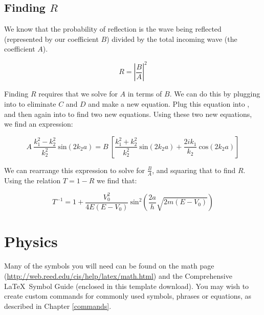 \subsection{Finding $R$}

We know that the probability of reflection is the wave being reflected (represented by our coefficient $B$) divided by the total incoming wave (the coefficient $A$).

$$R = \left|\frac{B}{A}\right|^2$$

Finding $R$ requires that we solve for $A$ in terms of $B$. We can do this by plugging  into  to eliminate $C$ and $D$ and make a new equation. Plug this equation into , and then again into  to find two new equations. Using these two new equations, we find an expression: 

$$ A~\frac{k_1^2-k_2^2}{k_2^2}~\mathrm{sin}(2k_2a) = B~\left[\frac{k_1^2+k_2^2}{k_2^2}~\mathrm{sin}(2k_2a) + \frac{2 i k_1}{k_2}~\mathrm{cos}(2k_2a)\right]$$

We can rearrange this expression to solve for $\frac{B}{A}$, and squaring that to find $R$. Using the relation $T = 1 - R$ we find that:

\begin{equation}
T^{-1} = 1 + \frac{V_0^2}{4 E (E - V_0)}~\mathrm{sin}^2\left(\frac{2 a}{h} \sqrt{2 m (E - V_0)}\right)
\end{equation}

    
    
    
\section{Physics}

Many of the symbols you will need can be found on the math page (\url{http://web.reed.edu/cis/help/latex/math.html}) and the Comprehensive \LaTeX\ Symbol Guide (enclosed in this template download).  You may wish to create custom commands for commonly used symbols, phrases or equations, as described in Chapter \ref{commands}.
